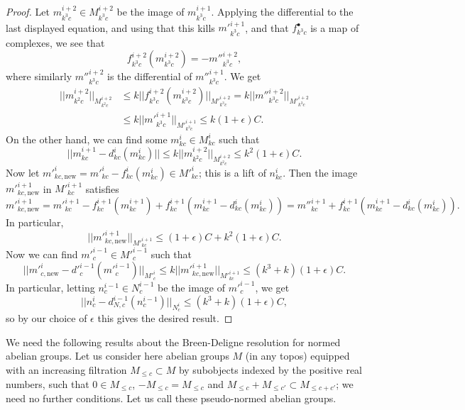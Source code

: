 \begin{proof}
Let $m^{i+2}_{k^3c}\in M^{i+2}_{k^3c}$ be the image of $m^{i+1}_{k^3c}$. Applying the differential to the last displayed equation, and using that this kills $m'^{i+1}_{k^3c}$, and that $f^\bullet_{k^3c}$ is a map of complexes, we see that
\[
f^{i+2}_{k^3c}(m^{i+2}_{k^3c}) = -m''^{i+2}_{k^3c},
\]
where similarly $m''^{i+2}_{k^3c}$ is the differential of $m''^{i+1}_{k^3c}$. We get
\[\begin{aligned}
||m^{i+2}_{k^2c}||_{M^{i+2}_{k^2c}}&\leq k||f^{i+2}_{k^3c}(m^{i+2}_{k^3c})||_{M'^{i+2}_{k^3c}} = k||m''^{i+2}_{k^3c}||_{M'^{i+2}_{k^3c}}\\
&\leq k||m'^{i+1}_{k^3c}||_{M'^{i+1}_{k^3c}}\leq k(1+\epsilon)C.
\end{aligned}\]
On the other hand, we can find some $m^i_{kc}\in M^i_{kc}$ such that
\[
||m^{i+1}_{kc}-d^i_{kc}(m^i_{kc})||\leq k||m^{i+2}_{k^2c}||_{M^{i+2}_{k^2c}}\leq k^2(1+\epsilon)C.
\]
Now let $m'^i_{kc,\mathrm{new}} = m'^i_{kc}-f^i_{kc}(m^i_{kc})\in M'^i_{kc}$; this is a lift of $n^i_{kc}$. Then the image $m'^{i+1}_{kc,\mathrm{new}}$ in $M'^{i+1}_{kc}$ satisfies
\[
m'^{i+1}_{kc,\mathrm{new}} = m'^{i+1}_{kc}-f^{i+1}_{kc}(m^{i+1}_{kc}) + f^{i+1}_{kc}(m^{i+1}_{kc}-d^i_{kc}(m^i_{kc})) = m''^{i+1}_{kc} + f^{i+1}_{kc}(m^{i+1}_{kc}-d^i_{kc}(m^i_{kc})).
\]
In particular,
\[
||m'^{i+1}_{kc,\mathrm{new}}||_{M'^{i+1}_{kc}}\leq (1+\epsilon)C+ k^2(1+\epsilon)C.
\]
Now we can find $m'^{i-1}_c\in M'^{i-1}_c$ such that
\[
||m'^i_{c,\mathrm{new}} - d'^{i-1}_c(m'^{i-1}_c)||_{M'^i_c}\leq k||m'^{i+1}_{kc,\mathrm{new}}||_{M'^{i+1}_{kc}}\leq (k^3+k)(1+\epsilon)C.
\]
In particular, letting $n^{i-1}_c\in N^{i-1}_c$ be the image of $m'^{i-1}_c$, we get
\[
||n^i_c - d^{i-1}_{N,c}(n^{i-1}_c)||_{N^i_c}\leq (k^3+k)(1+\epsilon)C,
\]
so by our choice of $\epsilon$ this gives the desired result.
\end{proof}

We need the following results about the Breen-Deligne resolution for normed abelian groups. Let us consider here abelian groups $M$ (in any topos) equipped with an increasing filtration $M_{\leq c}\subset M$ by subobjects indexed by the positive real numbers, such that $0\in M_{\leq c}$, $-M_{\leq c} = M_{\leq c}$ and $M_{\leq c}+M_{\leq c'}\subset M_{\leq c+c'}$; we need no further conditions. Let us call these pseudo-normed abelian groups.

